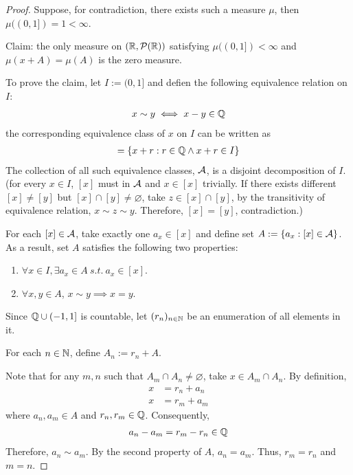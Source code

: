 \documentclass[11pt]{article}
\numberwithin{equation}{section}
\begin{document}
	\begin{proof}
		Suppose, for contradiction, there exists such a measure $\mu$, then $\mu((0, 1]) = 1 < \infty$.
		
		Claim: the only measure on $(\mathbb{R}, \mathcal{{P}}(\mathbb{R}))$ satisfying $\mu((0, 1]) < \infty$ and $\mu(x+A) = \mu(A)$ is the zero measure.
		
		To prove the claim, let $I := (0, 1]$ and defien the following equivalence relation on $I$:
		\begin{align}
			x \sim y \iff x - y \in \mathbb{Q}
		\end{align}
		the corresponding equivalence class of $x$ on $I$ can be written as
		\begin{align}
			[x] = \{x+r: r \in \Q \land x+r \in I\}
		\end{align}
		The collection of all such equivalence classes, $\mathcal{{A}}$, is a disjoint decomposition of $I$. (for every $x \in I$, $[x]$ must in $\mathcal{{A}}$ and $x \in [x]$ trivially. If there exists different $[x] \neq [y]$ but $[x] \cap [y] \neq \varnothing$, take $z \in [x] \cap [y]$, by the transitivity of equivalence relation, $x \sim z \sim y$. Therefore, $[x] = [y]$, contradiction.)
		
		For each $[x] \in \mathcal{{A}}$, take exactly one $a_x \in [x]$ and define set $A := \{a_x: [x] \in \mathcal{{A}}\}$. As a result, set $A$ satisfies the following two properties:
		\begin{enumerate}
			\item $\forall x \in I, \exists a_x \in A\ s.t.\ a_x \in [x]$.
			\item $\forall x, y \in A$, $x \sim y \implies x = y$.
		\end{enumerate}
		Since $\mathbb{Q} \cup (-1, 1]$ is countable, let $(r_n)_{n \in \mathbb{N}}$ be an enumeration of all elements in it.
		
		For each $n \in \mathbb{N}$, define $A_n := r_n + A$.
		
		Note that for any $m, n$ such that $A_m \cap A_n \neq \varnothing$, take $x \in A_m \cap A_n$. By definition, 
		\begin{align}
				x &= r_n + a_n \\
				x &= r_m + a_m
		\end{align}
		where $a_n, a_m \in A$ and $r_n, r_m \in \mathbb{Q}$. Consequently,
		\begin{align}
			a_n - a_m = r_m - r_n \in \mathbb{Q}
		\end{align}
		Therefore, $a_n \sim a_m$. By the second property of $A$, $a_n = a_m$. Thus, $r_m = r_n$ and $m = n$.
		

\end{proof}
\end{document}
